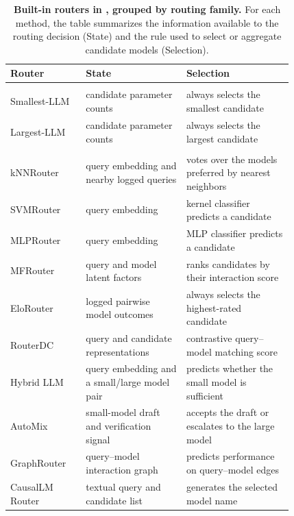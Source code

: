 \begin{table}[t]
\centering
\caption{\textbf{Built-in routers in \method, grouped by routing family.} For each method, the table summarizes the information available to the routing decision (State) and the rule used to select or aggregate candidate models (Selection).}
\label{tab:app-routers}
\small
\setlength{\tabcolsep}{4pt}
\renewcommand{\arraystretch}{1.08}
\newcommand{\routerspace}{\addlinespace[2pt]}
\begin{tabular}{
    p{0.20\linewidth}
    p{0.30\linewidth}
    p{0.32\linewidth}
}
\toprule
\textbf{Router} & \textbf{State} & \textbf{Selection} \\
\midrule
\rowcolor{barGray} \multicolumn{3}{c}{\textit{Rule-based baselines}} \\
Smallest-LLM
& candidate parameter counts
& always selects the smallest candidate \\
\routerspace
Largest-LLM
& candidate parameter counts
& always selects the largest candidate \\
\midrule
\rowcolor{barGray} \multicolumn{3}{c}{\textit{Single-turn routers}} \\
kNNRouter
& query embedding and nearby logged queries
& votes over the models preferred by nearest neighbors \\
\routerspace
SVMRouter
& query embedding
& kernel classifier predicts a candidate \\
\routerspace
MLPRouter
& query embedding
& MLP classifier predicts a candidate \\
\routerspace
MFRouter
& query and model latent factors
& ranks candidates by their interaction score \\
\routerspace
EloRouter
& logged pairwise model outcomes
& always selects the highest-rated candidate \\
\routerspace
RouterDC
& query and candidate representations
& contrastive query--model matching score \\
\routerspace
Hybrid LLM
& query embedding and a small/large model pair
& predicts whether the small model is sufficient \\
\routerspace
AutoMix
& small-model draft and verification signal
& accepts the draft or escalates to the large model \\
\routerspace
GraphRouter
& query--model interaction graph
& predicts performance on query--model edges \\
\routerspace
CausalLM Router
& textual query and candidate list
& generates the selected model name \\

\end{tabular}
\end{table}
